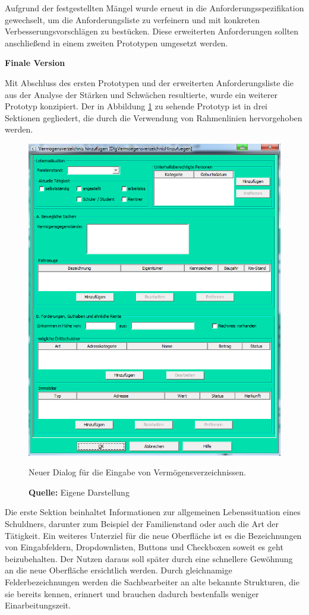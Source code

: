 Aufgrund der festgestellten Mängel wurde erneut in die Anforderungsspezifikation gewechselt, um die Anforderungsliste zu verfeinern und mit konkreten Verbesserungsvorschlägen zu bestücken. Diese erweiterten Anforderungen sollten anschließend in einem zweiten Prototypen umgesetzt werden.

\textbf{Finale Version}

Mit Abschluss des ersten Prototypen und der erweiterten Anforderungsliste die aus der Analyse der Stärken und Schwächen resultierte, wurde ein weiterer Prototyp konzipiert. Der in Abbildung \ref{fig:neuerDialog} zu sehende Prototyp ist in drei Sektionen gegliedert, die durch die Verwendung von Rahmenlinien hervorgehoben werden. 
\begin{figure}[H]
  \centering
  \includegraphics[scale=0.78]{img/neuer_Dialog.PNG}
  \caption{Neuer Dialog für die Eingabe von Vermögensverzeichnissen.}
    \caption*{\textbf{Quelle:} Eigene Darstellung}
  \label{fig:neuerDialog}
\end{figure}
Die erste Sektion beinhaltet Informationen zur allgemeinen Lebenssituation eines Schuldners, darunter zum Beispiel der Familienstand oder auch die Art der Tätigkeit. Ein weiteres Unterziel für die neue Oberfläche ist es die Bezeichnungen von Eingabfeldern, Dropdownlisten, Buttons und Checkboxen soweit es geht beizubehalten. Der Nutzen daraus soll später durch eine schnellere Gewöhnung an die neue Oberfläche ersichtlich werden. Durch gleichnamige Felderbezeichnungen werden die Sachbearbeiter an alte bekannte Strukturen, die sie bereits kennen, erinnert und brauchen dadurch bestenfalls weniger Einarbeitungszeit.

